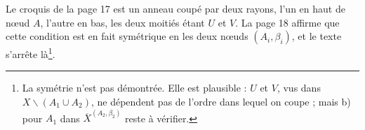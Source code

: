 \documentclass[11pt,a4paper]{article}
\begin{document}
Le croquis de la page 17 est un anneau coupé par deux rayons, l'un en haut de nœud
$A$, l'autre en bas, les deux moitiés étant $U$ et $V$. La page 18 affirme que cette
condition est en fait symétrique en les deux nœuds $(A_{i}, \beta_{i})$, et le
texte s'arrête là\footnote{La symétrie n'est pas démontrée. Elle est plausible :
$U$ et $V$, vus dans $X \smallsetminus (A_{1} \cup A_{2})$, ne dépendent pas de
l'ordre dans lequel on coupe ; mais b) pour $A_{1}$ dans
$\overline{X}^{(A_{2},\beta_{2})}$ reste à vérifier.}.
\end{document}
